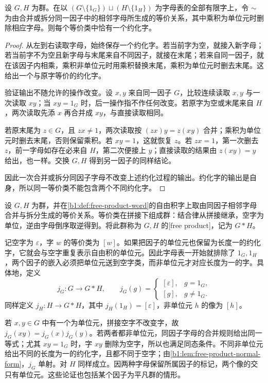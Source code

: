 \begin{lemma}\label{b1:lem:free-product-normal-form}
	设 \(G,H\) 为群。在以 \((G\setminus\{1_G\})\sqcup(H\setminus\{1_H\})\) 为字母表的全部有限字上，令 \(\sim\) 为由合并或拆分同一因子中的相邻字母所生成的等价关系，其中乘积为单位元时删除相应字母。则每个等价类中恰有一个约化字。
\end{lemma}
\begin{proof}
	从左到右读取字母，始终保存一个约化字。若当前字为空，就接入新字母；若当前字不为空且新字母与末尾来自不同因子，就接在末尾；若来自同一因子，就在该因子内相乘，乘积非单位元时用乘积替换末尾，乘积为单位元时删去末尾。这给出一个与原字等价的约化字。

	验证输出不随允许的操作改变。设 \(x,y\) 来自同一因子 \(G\)，比较连续读取 \(x,y\) 与一次读取 \(xy\)；当 \(xy=1_G\) 时，后一操作指不作任何改变。若原字为空或末尾来自 \(H\)，两次读取先添 \(x\) 再合并成 \(xy\)，与直接读取相同。

	若原末尾为 \(z\in G\)，且 \(zx\ne1\)，两次读取按 \((zx)y=z(xy)\) 合并；乘积为单位元时删去末尾，否则保留乘积。若 \(xy=1\)，这就恢复 \(z\)。若 \(zx=1\)，第一次删去 \(z\)，前一字母如存在必来自 \(H\)，第二次便接上 \(y\)；直接读取的结果由 \(z(xy)=y\) 给出，也一样。交换 \(G,H\) 得到另一因子的同样结论。

	因此一次合并或拆分同因子字母不改变上述约化过程的输出。约化字的输出是自身，所以同一等价类不能包含两个不同约化字。
\end{proof}

设 \(G,H\) 为群，并在\cref{b1:def:free-product-word}的自由积字上取由同因子相邻字母合并与拆分生成的等价关系。等价类在拼接下组成群：结合律从拼接继承，空字为单位，逆由字母倒序取逆得到。将此群称为 \(G,H\) 的[free product]，记为 \(G*H\)。

\ProseParagraphBreak
记空字为 \(\varepsilon\)，字 \(w\) 的等价类为 \([w]\)。如果把因子的单位元也保留为长度一的约化字，它就会与空字重复表示自由积的单位元。因此字母表一开始就排除了 \(1_G,1_H\)，两个因子的嵌入必须把单位元送到空字类，而非单位元才对应长度为一的字。具体地，定义
\[
	j_G:G\longrightarrow G*H,\qquad j_G(g)=
	\begin{cases}
		[\varepsilon],&g=1_G,\\
		[g],&g\ne1_G.
	\end{cases}
\]
同样定义 \(j_H:H\rightarrow G*H\)，其中 \(j_H(1_H)=[\varepsilon]\)，非单位元 \(h\) 的像为 \([h]\)。

\ProseParagraphBreak
若 \(x,y\in G\) 中有一个为单位元，拼接空字不改变字，故 \(j_G(xy)=j_G(x)j_G(y)\)。若两者都非单位元，同因子字母的合并规则给出同一等式；尤其 \(xy=1_G\) 时，字 \(xy\) 删除为空字，所以也满足同态条件。不同非单位元给出不同的长度为一的约化字，且都不同于空字；由\cref{b1:lem:free-product-normal-form}，\(j_G\) 单射。对 \(H\) 同样成立。因两种字母保留所属因子的标记，两个像的交只有单位元。这些论证也包括某个因子为平凡群的情形。


